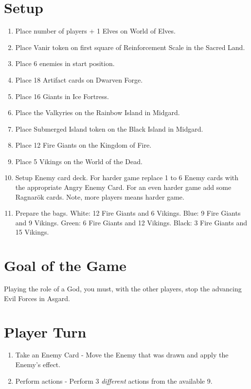 \documentclass[12pt]{article}
\newenvironment{enumerateCustom}
{\begin{enumerate}
  \setlength{\itemsep}{1pt}
  \setlength{\parskip}{0pt}
  \setlength{\parsep}{0pt}}
{\end{enumerate}}
\begin{document}
\begin{multicols*}{2}

\section*{Setup}
\begin{enumerateCustom}
	\item Place number of players + 1 Elves on World of Elves.
	\item Place Vanir token on first square of Reinforcement Scale in the Sacred Land.
	\item Place 6 enemies in start position.
	\item Place 18 Artifact cards on Dwarven Forge.
	\item Place 16 Giants in Ice Fortress.
	\item Place the Valkyries on the Rainbow Island in Midgard.
	\item Place Submerged Island token on the Black Island in Midgard.
	\item Place 12 Fire Giants on the Kingdom of Fire.
	\item Place 5 Vikings on the World of the Dead.
	\item Setup Enemy card deck. For harder game replace 1 to 6 Enemy cards with the appropriate Angry Enemy Card. For an even harder game add some Ragnar\"ok cards. Note, more players means harder game.
	\item Prepare the bags. White: 12 Fire Giants and 6 Vikings. Blue: 9 Fire Giants and 9 Vikings. Green: 6 Fire Giants and 12 Vikings. Black: 3 Fire Giants and 15 Vikings.
\end{enumerateCustom}

\section*{Goal of the Game}
Playing the role of a God, you must, with the other players, stop the advancing Evil Forces in Asgard.

\section*{Player Turn}
\begin{enumerateCustom}
	\item Take an Enemy Card - Move the Enemy that was drawn and apply the Enemy's effect.
	\item Perform actions - Perform 3 \emph{different} actions from the available 9.
\end{enumerateCustom}


\end{multicols*}
\end{document}
